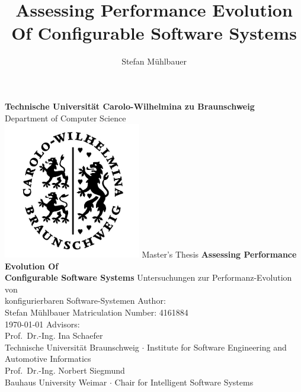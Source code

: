 \documentclass[
	12pt,
	a4paper,
	oneside,
	openright,
	listof=totoc%
]{scrbook}
\title{Assessing Performance Evolution Of Configurable Software Systems}
\author{Stefan Mühlbauer}
\begin{document}
\newcommand{\xz}{\textsf{GNU XZ}}
\newcommand{\xzwo}{\textsf{x264}}
\newtheorem{definition}{Def.~}[section]

\begin{titlepage}
    \centering
    {
    	\textbf{Technische Universität Carolo-Wilhelmina zu Braunschweig}\\ 
    		\vspace{2mm}
    	Department of Computer Science
    }
    \vspace{1.5cm}\\
    \includegraphics[width=6cm]{images/SiegelTU.png}%
    \vfill
    Master's Thesis
    \vfill
    {\bfseries\LARGE\linespread{2.0}
        Assessing Performance Evolution Of\\
        	\vspace{3mm}
         Configurable Software Systems
    }  
    \vfill
    {Untersuchungen zur Performanz-Evolution von \\
    konfigurierbaren Software-Systemen}
    \vfill
    {
    	Author:\\
    	\vspace{3mm}
    	{\Large Stefan Mühlbauer}
    }
    \vfill
    Matriculation Number: 4161884\\
    \vfill
    \today
    \vfill
    Advisors:\\
    \vspace{3mm}
    {\large Prof.~Dr.-Ing. Ina Schaefer}\\
    \vspace{1mm}
    {Technische Universität Braunschweig $\cdot$ Institute for Software
    Engineering and Automotive Informatics}\\
    \vspace{3mm}
    {\large Prof.~Dr.-Ing. Norbert Siegmund}\\
    \vspace{1mm}
    {Bauhaus University Weimar $\cdot$ Chair for Intelligent Software Systems}
\end{titlepage}
\end{document}
